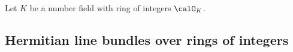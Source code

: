 
        





Let \(K\) be a number field with ring of integers \(\calO_K\). 

\subsection{Hermitian line bundles over rings of integers}

